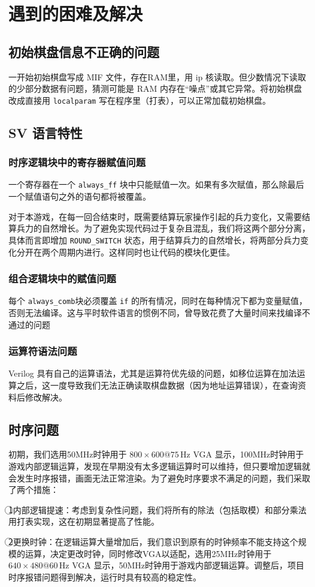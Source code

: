 \section{遇到的困难及解决}

\subsection{初始棋盘信息不正确的问题}
一开始初始棋盘写成 MIF 文件，存在RAM里，用 ip 核读取。但少数情况下读取的少部分数据有问题，猜测可能是 RAM 内存在“噪点”或其它异常。将初始棋盘改成直接用 \texttt{localparam} 写在程序里（打表），可以正常加载初始棋盘。

\subsection{SV 语言特性}
\subsubsection{时序逻辑块中的寄存器赋值问题}

一个寄存器在一个 \texttt{always\_ff} 块中只能赋值一次。如果有多次赋值，那么除最后一个赋值语句之外的语句都将被覆盖。

对于本游戏，在每一回合结束时，既需要结算玩家操作引起的兵力变化，又需要结算兵力的自然增长。为了避免实现代码过于复杂且混乱，我们将这两个部分分离，具体而言即增加 \texttt{ROUND\_SWITCH} 状态，用于结算兵力的自然增长，将两部分兵力变化分开在两个周期内进行。这样同时也让代码的模块化更佳。

\subsubsection{组合逻辑块中的赋值问题}
每个 \texttt{always\_comb}块必须覆盖 \texttt{if} 的所有情况，同时在每种情况下都为变量赋值，否则无法编译。这与平时软件语言的惯例不同，曾导致花费了大量时间来找编译不通过的问题

\subsubsection{运算符语法问题}
Verilog 具有自己的运算语法，尤其是运算符优先级的问题，如移位运算在加法运算之后，这一度导致我们无法正确读取棋盘数据（因为地址运算错误），在查询资料后修改解决。

\subsection{时序问题}
初期，我们选用50MHz时钟用于 $800\times600@75 \, \text{Hz}
$ VGA 显示，100MHz时钟用于游戏内部逻辑运算，发现在早期没有太多逻辑运算时可以维持，但只要增加逻辑就会发生时序报错，画面无法正常渲染。为了避免时序要求不满足的问题，我们采取了两个措施：

\textcircled{1}内部逻辑提速：考虑到复杂性问题，我们将所有的除法（包括取模）和部分乘法用打表实现，这在初期显著提高了性能。

\textcircled{2}更换时钟：在逻辑运算大量增加后，我们意识到原有的时钟频率不能支持这个规模的运算，决定更改时钟，同时修改VGA以适配，选用25MHz时钟用于 $640\times480@60 \, \text{Hz}
$ VGA 显示，50MHz时钟用于游戏内部逻辑运算。调整后，项目时序报错问题得到解决，运行时具有较高的稳定性。